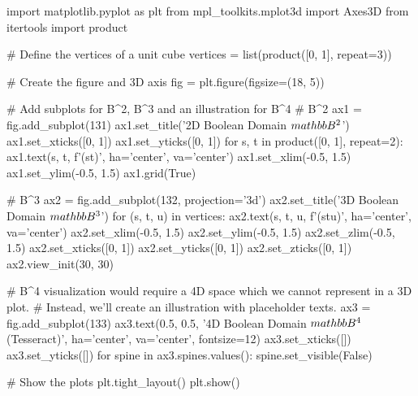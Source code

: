 import matplotlib.pyplot as plt
from mpl_toolkits.mplot3d import Axes3D
from itertools import product

# Define the vertices of a unit cube
vertices = list(product([0, 1], repeat=3))

# Create the figure and 3D axis
fig = plt.figure(figsize=(18, 5))

# Add subplots for B^2, B^3 and an illustration for B^4
# B^2
ax1 = fig.add_subplot(131)
ax1.set_title('2D Boolean Domain $\\mathbb{B}^2$')
ax1.set_xticks([0, 1])
ax1.set_yticks([0, 1])
for s, t in product([0, 1], repeat=2):
    ax1.text(s, t, f'({s}{t})', ha='center', va='center')
ax1.set_xlim(-0.5, 1.5)
ax1.set_ylim(-0.5, 1.5)
ax1.grid(True)

# B^3
ax2 = fig.add_subplot(132, projection='3d')
ax2.set_title('3D Boolean Domain $\\mathbb{B}^3$')
for (s, t, u) in vertices:
    ax2.text(s, t, u, f'({s}{t}{u})', ha='center', va='center')
ax2.set_xlim(-0.5, 1.5)
ax2.set_ylim(-0.5, 1.5)
ax2.set_zlim(-0.5, 1.5)
ax2.set_xticks([0, 1])
ax2.set_yticks([0, 1])
ax2.set_zticks([0, 1])
ax2.view_init(30, 30)

# B^4 visualization would require a 4D space which we cannot represent in a 3D plot.
# Instead, we'll create an illustration with placeholder texts.
ax3 = fig.add_subplot(133)
ax3.text(0.5, 0.5, '4D Boolean Domain $\\mathbb{B}^4$\n(Tesseract)', ha='center', va='center', fontsize=12)
ax3.set_xticks([])
ax3.set_yticks([])
for spine in ax3.spines.values():
    spine.set_visible(False)

# Show the plots
plt.tight_layout()
plt.show()
